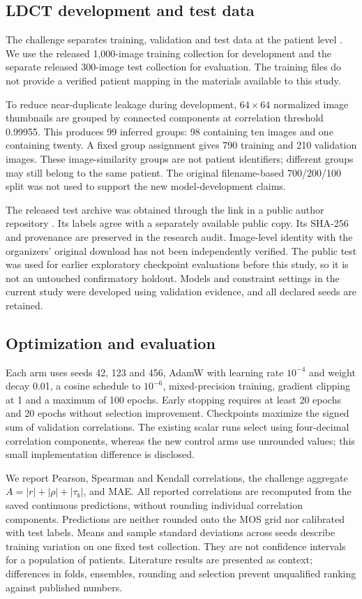 \documentclass[11pt]{article}
\begin{document}
\subsection{LDCT development and test data}
The challenge separates training, validation and test data at the patient level \cite{challenge}. We use the released 1,000-image training collection for development and the separate released 300-image test collection for evaluation. The training files do not provide a verified patient mapping in the materials available to this study.

To reduce near-duplicate leakage during development, $64\times64$ normalized image thumbnails are grouped by connected components at correlation threshold 0.99955. This produces 99 inferred groups: 98 containing ten images and one containing twenty. A fixed group assignment gives 790 training and 210 validation images. These image-similarity groups are not patient identifiers; different groups may still belong to the same patient. The original filename-based 700/200/100 split was not used to support the new model-development claims.

The released test archive was obtained through the link in a public author repository \cite{medsiglipcode}. Its labels agree with a separately available public copy. Its SHA-256 and provenance are preserved in the research audit. Image-level identity with the organizers' original download has not been independently verified. The public test was used for earlier exploratory checkpoint evaluations before this study, so it is not an untouched confirmatory holdout. Models and constraint settings in the current study were developed using validation evidence, and all declared seeds are retained.

\subsection{Optimization and evaluation}
Each arm uses seeds 42, 123 and 456, AdamW with learning rate $10^{-4}$ and weight decay 0.01, a cosine schedule to $10^{-6}$, mixed-precision training, gradient clipping at 1 and a maximum of 100 epochs. Early stopping requires at least 20 epochs and 20 epochs without selection improvement. Checkpoints maximize the signed sum of validation correlations. The existing scalar runs select using four-decimal correlation components, whereas the new control arms use unrounded values; this small implementation difference is disclosed.

We report Pearson, Spearman and Kendall correlations, the challenge aggregate $A=|r|+|\rho|+|\tau_b|$, and MAE. All reported correlations are recomputed from the saved continuous predictions, without rounding individual correlation components. Predictions are neither rounded onto the MOS grid nor calibrated with test labels. Means and sample standard deviations across seeds describe training variation on one fixed test collection. They are not confidence intervals for a population of patients. Literature results are presented as context; differences in folds, ensembles, rounding and selection prevent unqualified ranking against published numbers.
\end{document}
